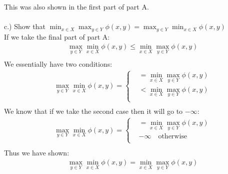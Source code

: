 \documentclass[12pt]{article}
\begin{document}
    This was also shown in the first part of part A.\\\\
    c.) Show that $\min_{x \in X} \max_{y \in Y} \phi(x,y) = \max_{y \in Y} \min_{x \in X} \phi(x,y)$\\
    If we take the final part of part A:\\
        \begin{align*}
             &\max_{y \in Y} \min_{x \in X} \phi(x,y) \leq \min_{x \in X} \max_{y \in Y} \phi(x,y)\\
        \end{align*}
    We essentially have two conditions:\\
        \begin{align*}
            &\max_{y \in Y} \min_{x \in X} \phi(x,y) = 
            \begin{cases}
                     &= \min_{x \in X} \max_{y \in Y} \phi(x,y)\\
                    &< \min_{x \in X} \max_{y \in Y} \phi(x,y)\\
                \end{cases}\\
        \end{align*}
    We know that if we take the second case then it will go to $-\infty$:\\
        \begin{align*}
            &\max_{y \in Y} \min_{x \in X} \phi(x,y) = 
            \begin{cases}
                     &= \min_{x \in X} \max_{y \in Y} \phi(x,y)\\
                    &-\infty \quad \text{otherwise}\\
                \end{cases}\\
        \end{align*}
    Thus we have shown:\\
        \begin{align*}
             &\max_{y \in Y} \min_{x \in X} \phi(x,y) = \min_{x \in X} \max_{y \in Y} \phi(x,y)\\
        \end{align*}
\end{document}
